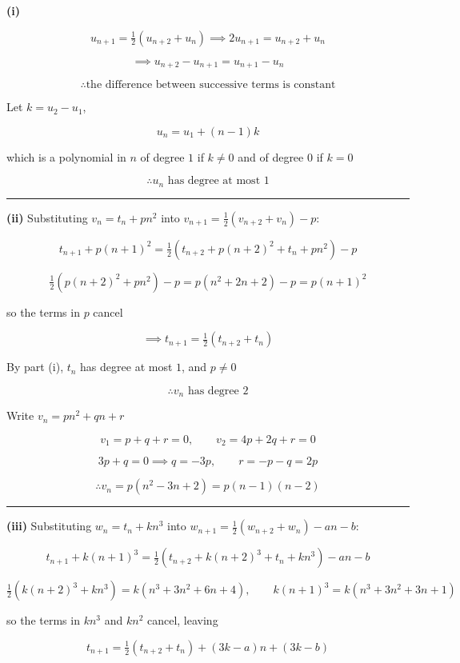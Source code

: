 \documentclass[12pt]{article}
\begin{document}
\newcommand{\ds}{\displaystyle}

\textbf{(i)}

$$u_{n+1}=\tfrac12\left(u_{n+2}+u_n\right)\implies 2u_{n+1}=u_{n+2}+u_n$$

$$\implies u_{n+2}-u_{n+1}=u_{n+1}-u_n$$

$$\therefore \boxed{\text{the difference between successive terms is constant}}$$

\bigskip

Let $k=u_2-u_1$,

$$u_n=u_1+(n-1)k$$

which is a polynomial in $n$ of degree $1$ if $k\neq0$ and of degree $0$ if $k=0$

$$\therefore \boxed{u_n\text{ has degree at most }1}$$

\bigskip\hrule\bigskip

\textbf{(ii)} Substituting $v_n=t_n+pn^2$ into $\ds v_{n+1}=\tfrac12\left(v_{n+2}+v_n\right)-p$:

$$t_{n+1}+p(n+1)^2=\tfrac12\left(t_{n+2}+p(n+2)^2+t_n+pn^2\right)-p$$

$$\tfrac12\left(p(n+2)^2+pn^2\right)-p=p\left(n^2+2n+2\right)-p=p(n+1)^2$$

so the terms in $p$ cancel

$$\implies t_{n+1}=\tfrac12\left(t_{n+2}+t_n\right)$$

By part (i), $t_n$ has degree at most $1$, and $p\neq0$

$$\therefore \boxed{v_n\text{ has degree }2}$$

\bigskip

Write $v_n=pn^2+qn+r$

$$v_1=p+q+r=0,\qquad v_2=4p+2q+r=0$$

$$3p+q=0\implies q=-3p,\qquad r=-p-q=2p$$

$$\therefore \boxed{v_n=p\left(n^2-3n+2\right)=p(n-1)(n-2)}$$

\bigskip\hrule\bigskip

\textbf{(iii)} Substituting $w_n=t_n+kn^3$ into $\ds w_{n+1}=\tfrac12\left(w_{n+2}+w_n\right)-an-b$:

$$t_{n+1}+k(n+1)^3=\tfrac12\left(t_{n+2}+k(n+2)^3+t_n+kn^3\right)-an-b$$

$$\tfrac12\left(k(n+2)^3+kn^3\right)=k\left(n^3+3n^2+6n+4\right),\qquad k(n+1)^3=k\left(n^3+3n^2+3n+1\right)$$

so the terms in $kn^3$ and $kn^2$ cancel, leaving

$$t_{n+1}=\tfrac12\left(t_{n+2}+t_n\right)+(3k-a)n+(3k-b)$$
\end{document}
